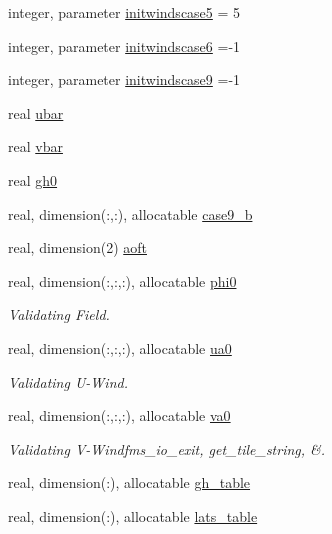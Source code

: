 \begin{DoxyCompactItemize}
\item 
integer, parameter \hyperlink{classtest__cases__mod_ac567d8bd4c95a1655c612b3a193c1ea3}{initwindscase5} = 5
\item 
integer, parameter \hyperlink{classtest__cases__mod_aefad7f694cc274e910aa9a2cd8f4635f}{initwindscase6} =-\/1
\item 
integer, parameter \hyperlink{classtest__cases__mod_a4d993fcfbe5c8e8e07b74f394b8ae1b9}{initwindscase9} =-\/1
\item 
real \hyperlink{classtest__cases__mod_a3511ba6fb2dcfd0c5575f0568a060924}{ubar}
\item 
real \hyperlink{classtest__cases__mod_a8c4fdfdfac04288502c9ec94febd848a}{vbar}
\item 
real \hyperlink{classtest__cases__mod_a0330d24892de013b82c806b2eb174802}{gh0}
\item 
real, dimension(\-:,\-:), allocatable \hyperlink{classtest__cases__mod_ad4fbc67ecd0c262bdc856412254fcd12}{case9\-\_\-b}
\item 
real, dimension(2) \hyperlink{classtest__cases__mod_a701517a60d6bee3efcc10042ca4353ba}{aoft}
\item 
real, dimension(\-:,\-:,\-:), allocatable \hyperlink{classtest__cases__mod_a1bc1841e0de13798d6a15b088b9190fe}{phi0}
\begin{DoxyCompactList}\small\item\em Validating Field. \end{DoxyCompactList}\item 
real, dimension(\-:,\-:,\-:), allocatable \hyperlink{classtest__cases__mod_a732ccc75bb62730c4901b3197a4ca0db}{ua0}
\begin{DoxyCompactList}\small\item\em Validating U-\/\-Wind. \end{DoxyCompactList}\item 
real, dimension(\-:,\-:,\-:), allocatable \hyperlink{classtest__cases__mod_ae762ff3757574df1e4826d061587ee9f}{va0}
\begin{DoxyCompactList}\small\item\em Validating V-\/\-Windfms\-\_\-io\-\_\-exit, get\-\_\-tile\-\_\-string, \&. \end{DoxyCompactList}\item 
real, dimension(\-:), allocatable \hyperlink{classtest__cases__mod_a3e0198270bedfe3033ecef4e3d910c53}{gh\-\_\-table}
\item 
real, dimension(\-:), allocatable \hyperlink{classtest__cases__mod_ab29f3455dbdffa40ac33075ff47eb95f}{lats\-\_\-table}

\end{DoxyCompactItemize}

